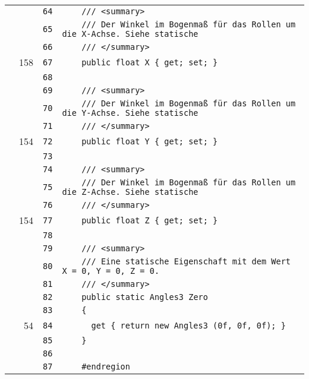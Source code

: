 \documentclass[a4paper,10pt]{article}
\begin{document}
\begin{longtable}[l]{lrrl}
\cellcolor{gray} &  & \verb~64~ & \verb~    /// <summary>~\\
\cellcolor{gray} &  & \verb~65~ & \verb~    /// Der Winkel im Bogenmaß für das Rollen um die X-Achse. Siehe statische ~\\
\cellcolor{gray} &  & \verb~66~ & \verb~    /// </summary>~\\
\cellcolor{green} & 158 & \verb~67~ & \verb~    public float X { get; set; }~\\
\cellcolor{gray} &  & \verb~68~ & \verb~~\\
\cellcolor{gray} &  & \verb~69~ & \verb~    /// <summary>~\\
\cellcolor{gray} &  & \verb~70~ & \verb~    /// Der Winkel im Bogenmaß für das Rollen um die Y-Achse. Siehe statische ~\\
\cellcolor{gray} &  & \verb~71~ & \verb~    /// </summary>~\\
\cellcolor{green} & 154 & \verb~72~ & \verb~    public float Y { get; set; }~\\
\cellcolor{gray} &  & \verb~73~ & \verb~~\\
\cellcolor{gray} &  & \verb~74~ & \verb~    /// <summary>~\\
\cellcolor{gray} &  & \verb~75~ & \verb~    /// Der Winkel im Bogenmaß für das Rollen um die Z-Achse. Siehe statische ~\\
\cellcolor{gray} &  & \verb~76~ & \verb~    /// </summary>~\\
\cellcolor{green} & 154 & \verb~77~ & \verb~    public float Z { get; set; }~\\
\cellcolor{gray} &  & \verb~78~ & \verb~~\\
\cellcolor{gray} &  & \verb~79~ & \verb~    /// <summary>~\\
\cellcolor{gray} &  & \verb~80~ & \verb~    /// Eine statische Eigenschaft mit dem Wert X = 0, Y = 0, Z = 0.~\\
\cellcolor{gray} &  & \verb~81~ & \verb~    /// </summary>~\\
\cellcolor{gray} &  & \verb~82~ & \verb~    public static Angles3 Zero~\\
\cellcolor{gray} &  & \verb~83~ & \verb~    {~\\
\cellcolor{green} & 54 & \verb~84~ & \verb~      get { return new Angles3 (0f, 0f, 0f); }~\\
\cellcolor{gray} &  & \verb~85~ & \verb~    }~\\
\cellcolor{gray} &  & \verb~86~ & \verb~~\\
\cellcolor{gray} &  & \verb~87~ & \verb~    #endregion~\\

\end{longtable}
\end{document}
